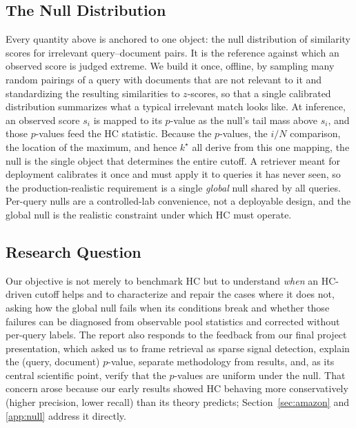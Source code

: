 \documentclass[letterpaper]{article}
\begin{document}
\subsection{The Null Distribution}
Every quantity above is anchored to one object: the null distribution of
similarity scores for irrelevant query--document pairs. It is the
reference against which an observed score is judged extreme. We build it
once, offline, by sampling many random pairings of a query with documents
that are not relevant to it and standardizing the resulting similarities
to $z$-scores, so that a single calibrated distribution summarizes what a
typical irrelevant match looks like. At inference, an observed score
$s_i$ is mapped to its $p$-value as the null's tail mass above $s_i$, and
those $p$-values feed the HC statistic. Because the $p$-values, the $i/N$
comparison, the location of the maximum, and hence $k^\star$ all derive
from this one mapping, the null is the single object that determines the
entire cutoff. A retriever meant for deployment calibrates it once and
must apply it to queries it has never seen, so the production-realistic
requirement is a single \emph{global} null shared by all queries.
Per-query nulls are a controlled-lab convenience, not a deployable
design, and the global null is the realistic constraint under which HC
must operate.

\subsection{Research Question}
Our objective is not merely to benchmark HC but to understand
\emph{when} an HC-driven cutoff helps and to characterize and repair the
cases where it does not, asking how the global null fails when its
conditions break and whether those failures can be diagnosed from
observable pool statistics and corrected without per-query labels. The
report also responds to the feedback from our final project presentation,
which asked us to frame retrieval as sparse signal detection, explain the
(query, document) $p$-value, separate methodology from results, and, as
its central scientific point, verify that the $p$-values are uniform
under the null. That concern arose because our early results showed HC
behaving more conservatively (higher precision, lower recall) than its
theory predicts; Section~\ref{sec:amazon} and \ref{app:null}
address it directly.

\end{document}
